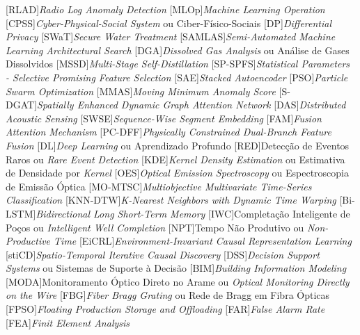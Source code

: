 \begin{acronym}
    [RLAD]{\textit{Radio Log Anomaly Detection}}
    [MLOp]{\textit{Machine Learning Operation}}
    [CPSS]{\textit{Cyber-Physical-Social System} ou Ciber-Físico-Sociais}
    [DP]{\textit{Differential Privacy}}
    [SWaT]{\textit{Secure Water Treatment}}
    [SAMLAS]{\textit{Semi-Automated Machine Learning Architectural Search}}
    [DGA]{\textit{Dissolved Gas Analysis} ou Análise de Gases Dissolvidos}
    [MSSD]{\textit{Multi-Stage Self-Distillation}}
    [SP-SPFS]{\textit{Statistical Parameters - Selective Promising Feature Selection}}
    [SAE]{\textit{Stacked Autoencoder}}
    [PSO]{\textit{Particle Swarm Optimization}}
    [MMAS]{\textit{Moving Minimum Anomaly Score}}
    [S-DGAT]{\textit{Spatially Enhanced Dynamic Graph Attention Network}}
    [DAS]{\textit{Distributed Acoustic Sensing}}
    [SWSE]{\textit{Sequence-Wise Segment Embedding}}
    [FAM]{\textit{Fusion Attention Mechanism}}
    [PC-DFF]{\textit{Physically Constrained Dual-Branch Feature Fusion}}
    [DL]{\textit{Deep Learning} ou Aprendizado Profundo}
    [RED]{Detecção de Eventos Raros ou \textit{Rare Event Detection}}
    [KDE]{\textit{Kernel Density Estimation} ou Estimativa de Densidade por \textit{Kernel}}
    [OES]{\textit{Optical Emission Spectroscopy} ou Espectroscopia de Emissão Óptica}
    [MO-MTSC]{\textit{Multiobjective Multivariate Time-Series Classification}}
    [KNN-DTW]{\textit{K-Nearest Neighbors with Dynamic Time Warping}}
    [Bi-LSTM]{\textit{Bidirectional Long Short-Term Memory}}
    [IWC]{Completação Inteligente de Poços ou \textit{Intelligent Well Completion}}
    [NPT]{Tempo Não Produtivo ou \textit{Non-Productive Time}}
    [EiCRL]{\textit{Environment-Invariant Causal Representation Learning}}
    [stiCD]{\textit{Spatio-Temporal Iterative Causal Discovery}}
    [DSS]{\textit{Decision Support Systems} ou Sistemas de Suporte à Decisão}
    [BIM]{\textit{Building Information Modeling}}
    [MODA]{Monitoramento Óptico Direto no Arame ou \textit{Optical
Monitoring Directly on the Wire}}
    [FBG]{\textit{Fiber Bragg Grating} ou Rede de Bragg em Fibra Ópticas}
    [FPSO]{\textit{Floating Production Storage and Offloading}}
    [FAR]{\textit{False Alarm Rate}}
    [FEA]{\textit{Finit Element Analysis}}

\end{acronym}
